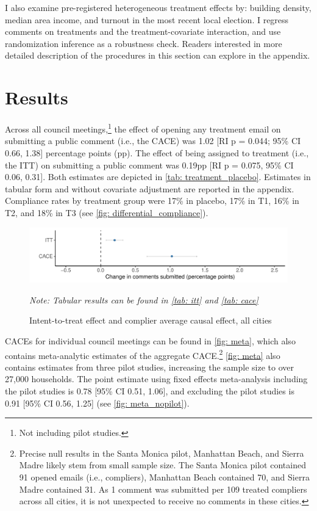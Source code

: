 \documentclass[12pt,final,fleqn]{article}
\theoremstyle{plain}
\begin{document}
I also examine pre-registered heterogeneous treatment effects by: building density, median area income, and turnout in the most recent local election. I regress comments on treatments and the treatment-covariate interaction, and use randomization inference as a robustness check. Readers interested in more detailed description of the procedures in this section can explore  in the appendix.  


\section{Results} \label{sec: results}

Across all council meetings,\footnote{Not including pilot studies.} the effect of opening any treatment email on submitting a public comment (i.e., the CACE) was 1.02 [RI p = 0.044; 95\% CI 0.66, 1.38] percentage points (pp). The effect of being assigned to treatment (i.e., the ITT) on submitting a public comment was 0.19pp [RI p = 0.075, 95\% CI 0.06, 0.31]. Both estimates are depicted in \autoref{tab: treatment_placebo}. Estimates in tabular form and without covariate adjustment are reported in the appendix. Compliance rates by treatment group were 17\% in placebo, 17\% in T1, 16\% in T2, and 18\% in T3 (see \autoref{fig: differential_compliance}).

\begin{figure}[H]
\includegraphics[width = \textwidth]{../figs/fg1.pdf}
\caption{Intent-to-treat effect and complier average causal effect, all cities}
\vspace{-0.5cm}
{\small \textit{Note: Tabular results can be found in \autoref{tab: itt} and \autoref{tab: cace}}}
\label{tab: treatment_placebo}
\end{figure}

CACEs for individual council meetings can be found in \autoref{fig: meta}, which also contains meta-analytic estimates of the aggregate CACE.\footnote{Precise null results in the Santa Monica pilot, Manhattan Beach, and Sierra Madre likely stem from small sample size. The Santa Monica pilot contained 91 opened emails (i.e., compliers), Manhattan Beach contained 70, and Sierra Madre contained 31. As 1 comment was submitted per 109 treated compliers across all cities, it is not unexpected to receive no comments in these cities.}  \autoref{fig: meta} also contains  estimates from three pilot studies, increasing the sample size to over 27,000 households. The point estimate using fixed effects meta-analysis including the pilot studies is 0.78 [95\% CI 0.51, 1.06], and excluding the pilot studies is 0.91 [95\% CI 0.56, 1.25] (see \autoref{fig: meta_nopilot}).
\end{document}
